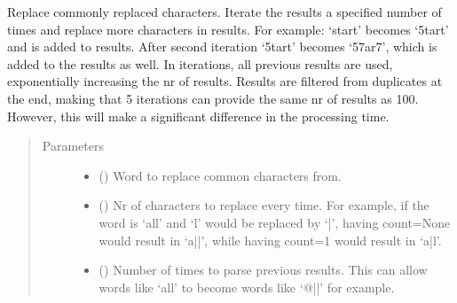 \documentclass[letterpaper,10pt,english]{sphinxmanual}
\begin{document}
\begin{fulllineitems}
\begin{fulllineitems}
\end{fulllineitems}


\begin{fulllineitems}
\label{\detokenize{EntroPass:EntroPass.pwd_gen.Pwd_gen.rep_cmmn_chars}}
\sphinxAtStartPar
Replace commonly replaced characters. Iterate the results a specified number of times
and replace more characters in results. For example: ‘start’ becomes ‘5tart’ and is
added to results. After second iteration ‘5tart’ becomes ‘57ar7’, which is added to
the results as well. In iterations, all previous results are used, exponentially increasing
the nr of results. Results are filtered from duplicates at the end, making that 5
iterations can provide the same nr of results as 100. However, this will make a
significant difference in the processing time.
\begin{quote}\begin{description}
\item[{Parameters}] \leavevmode\begin{itemize}
\item {} 
\sphinxAtStartPar
{} () \textendash{} Word to replace common characters from.

\item {} 
\sphinxAtStartPar
{} (\sphinxstyleliteralemphasis{\sphinxupquote{, }}) \textendash{} Nr of characters to replace every time. For example, if the word is ‘all’ and ‘l’
would be replaced by ‘|’, having count=None would result in ‘a||’, while having count=1
would result in ‘a|l’.

\item {} 
\sphinxAtStartPar
{} (\sphinxstyleliteralemphasis{\sphinxupquote{, }}) \textendash{} Number of times to parse previous results. This can allow words like ‘all’ to
become words like ‘@||’ for example.


\end{itemize}
\end{description}
\end{quote}
\end{fulllineitems}
\end{fulllineitems}
\end{document}

